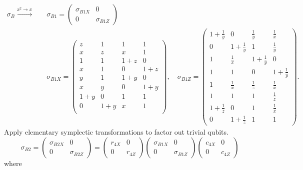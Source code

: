 \begin{align*}
\sigma_B \xrightarrow{x^2 \to x} \quad
&\sigma_{B1} = \begin{pmatrix} \sigma_{B1X} & 0 \\ 0 & \sigma_{B1Z} \end{pmatrix} \\
&
\sigma_{B1X} =
\begin{pmatrix}
 z & 1 & 1 & 1   \\
 x & z & x & 1   \\
 1 & 1 & 1+z & 0 \\
 x & 1 & 0 & 1+z \\
 y & 1 & 1+y & 0 \\
 x & y & 0 & 1+y \\
 1+y & 0 & 1 & 1 \\
 0 & 1+y & x & 1 \\
\end{pmatrix},
\quad
\sigma_{B1Z} =
\begin{pmatrix}
 1+\frac{1}{y} & 0 & \frac{1}{y} & \frac{1}{x} \\
 0 & 1+\frac{1}{y} & 1 & \frac{1}{y} \\
 1 & \frac{1}{x} & 1+\frac{1}{y} & 0 \\
 1 & 1 & 0 & 1+\frac{1}{y} \\
 1 & \frac{1}{x} & \frac{1}{z} & \frac{1}{x} \\
 1 & 1 & 1 & \frac{1}{z} \\
 1+\frac{1}{z} & 0 & 1 & \frac{1}{x} \\
 0 & 1+\frac{1}{z} & 1 & 1
\end{pmatrix}.
\end{align*}
Apply elementary symplectic transformations to factor out trivial qubits.
\[
\sigma_{B2} =
 \begin{pmatrix} \sigma_{B2X} & 0 \\ 0 & \sigma_{B2Z} \end{pmatrix}
=
\begin{pmatrix} r_{4X} & 0 \\ 0 & r_{4Z} \end{pmatrix}
\begin{pmatrix} \sigma_{B1X} & 0 \\ 0 & \sigma_{B1Z} \end{pmatrix}
\begin{pmatrix} c_{4X} & 0 \\ 0 & c_{4Z} \end{pmatrix}
\]
where
